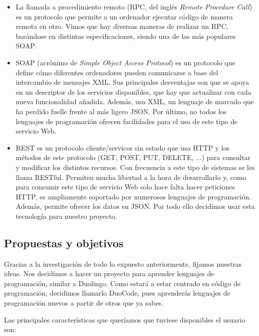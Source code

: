 \begin{itemize}
\item
La llamada a procedimiento remoto (RPC, del inglés \emph{Remote Procedure Call}) es un protocolo que permite a un ordenador ejecutar código de manera remota en otro. Vimos que hay diversas maneras de realizar un RPC, basándose en distintas especificaciones, siendo una de las más populares SOAP.

\item
SOAP (acrónimo de \emph{Simple Object Access Protocol}) es un protocolo que define cómo diferentes ordenadores pueden comunicarse a base del intercambio de mensajes XML. Sus principales desventajas son que se apoya en un descriptor de los servicios disponibles, que hay que actualizar con cada nueva funcionalidad añadida. Además, usa XML, un lenguaje de marcado que ha perdido fuelle frente al más ligero JSON. Por último, no todos los lenguajes de programación ofrecen facilidades para el uso de este tipo de servicio Web.

\item
REST es un protocolo cliente/servicor sin estado que usa HTTP y los métodos de este protocolo (GET, POST, PUT, DELETE, ...) para consultar y modificar los distintos recursos. Con frecuencia a este tipo de sistemas se les llama RESTful. Permiten mucha libertad a la hora de desarrollarlo y, como para consumir este tipo de servicio Web solo hace falta hacer peticiones HTTP, es ampliamente soportado por numerosos lenguajes de programación. Además, permite ofrecer los datos en JSON. Por todo ello decidimos usar esta tecnología para nuestro proyecto.

\end{itemize}

\subsection{Propuestas y objetivos\label{subsec:objetivos}}

Gracias a la investigación de todo lo expuesto anteriormente, fijamos nuestras ideas. Nos decidimos a hacer un proyecto para aprender lenguajes de programación, similar a Duolingo. Como estará a estar centrado en código de programación, decidimos llamarlo DuoCode, pues aprenderás lenguajes de programación nuevos a partir de otros que ya sabes. 

Las principales características que queríamos que tuviese disponibles el usuario son:

